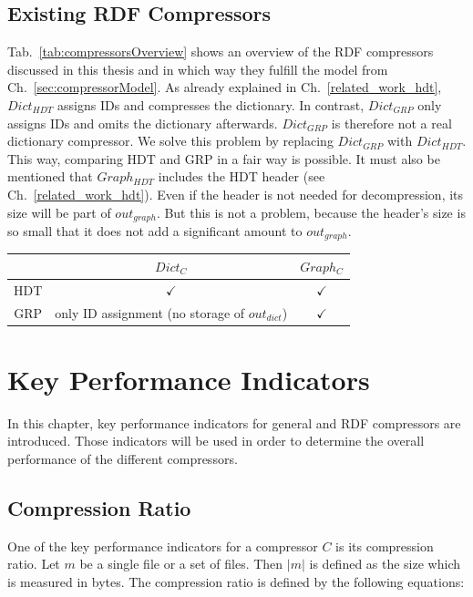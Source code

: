 \subsection{Existing RDF  Compressors}

Tab.~\ref{tab:compressorsOverview} shows an overview of the RDF compressors discussed in this thesis and in which way they fulfill the model from Ch.~\ref{sec:compressorModel}. As already explained in Ch.~\ref{related_work_hdt}, $Dict_{HDT}$ assigns IDs and compresses the dictionary. In contrast, $Dict_{GRP}$  only assigns IDs and omits the dictionary afterwards. $Dict_{GRP}$ is therefore not a real dictionary compressor. We solve this problem by replacing  $Dict_{GRP}$ with $Dict_{HDT}$. This way, comparing HDT and GRP in a fair way is possible. It must also be mentioned that $Graph_{HDT}$ includes the HDT header (see Ch.~\ref{related_work_hdt}). Even if the header is not needed for decompression, its size will be part of $out_{graph}$. But this is not a problem, because the header's size is so small that it does not add a significant amount to $out_{graph}$.

\begin{center}
	\begin{tabular}{|c|c|c|}
		\hline 
		& $Dict_{C}$ & $Graph_{C}$ \\ 
		\hline \hline
		HDT & $\checkmark$ & $\checkmark$  \\ 
		\hline 
		GRP & only ID assignment (no storage of $out_{dict}$) & $\checkmark$ \\ 
		\hline 
	\end{tabular} 
	\label{tab:compressorsOverview}
\end{center}

\section{Key Performance Indicators}

In this chapter, key performance indicators for general and RDF compressors are introduced. Those indicators will be used in order to determine the overall performance of the different compressors.

\subsection{Compression Ratio}

One of the key performance indicators for a compressor $C$ is its compression ratio. Let $m$ be a single file or a set of files. Then $|m|$ is defined as the size which is measured in bytes. The compression ratio is defined by the following equations:

